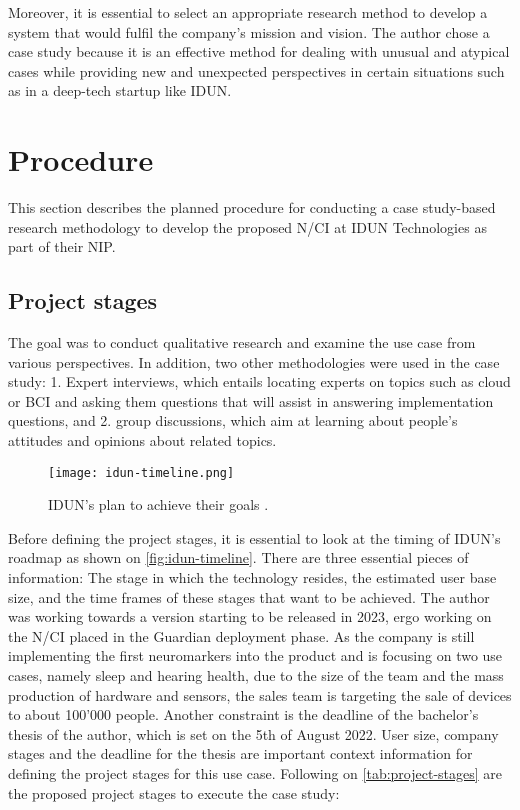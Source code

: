 Moreover, it is essential to select an appropriate research method to develop a system that would fulfil the company's mission and vision. The author chose a case study because it is an effective method for dealing with unusual and atypical cases while providing new and unexpected perspectives in certain situations such as in a deep-tech startup like IDUN.

\section{Procedure}
\label{chapter3-procedure}

This section describes the planned procedure for conducting a case study-based research methodology to develop the proposed N/CI at IDUN Technologies as part of their NIP.

\subsection{Project stages}
\label{chapter3-project-stages}

The goal was to conduct qualitative research and examine the use case from various perspectives. In addition, two other methodologies were used in the case study: 1. Expert interviews, which entails locating experts on topics such as cloud or BCI and asking them questions that will assist in answering implementation questions, and 2. group discussions, which aim at learning about people's attitudes and opinions about related topics.

\begin{figure}[!ht]
  \centering
  \texttt{[image: idun-timeline.png]}
  \caption[IDUN's plan to achieve their goals]{IDUN's plan to achieve their goals \citep{idun_guardian_nodate}.}
  \label{fig:idun-timeline}
\end{figure}

Before defining the project stages, it is essential to look at the timing of IDUN's roadmap as shown on \autoref{fig:idun-timeline}. There are three essential pieces of information: The stage in which the technology resides, the estimated user base size, and the time frames of these stages that want to be achieved. The author was working towards a version starting to be released in 2023, ergo working on the N/CI placed in the Guardian deployment phase. As the company is still implementing the first neuromarkers into the product and is focusing on two use cases, namely sleep and hearing health, due to the size of the team and the mass production of hardware and sensors, the sales team is targeting the sale of devices to about 100'000 people. Another constraint is the deadline of the bachelor's thesis of the author, which is set on the 5th of August 2022. User size, company stages and the deadline for the thesis are important context information for defining the project stages for this use case. Following on \autoref{tab:project-stages} are the proposed project stages to execute the case study:

